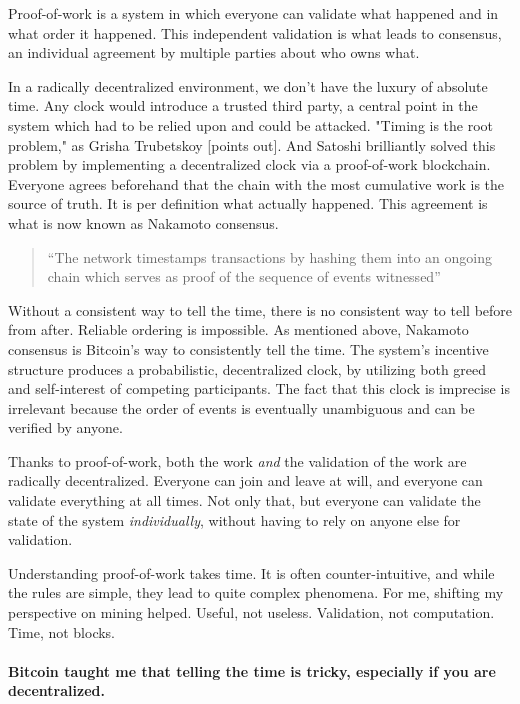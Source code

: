 Proof-of-work is a system in which everyone can validate what happened
and in what order it happened. This independent validation is what leads
to consensus, an individual agreement by multiple parties about who owns
what.

In a radically decentralized environment, we don't have the luxury of
absolute time. Any clock would introduce a trusted third party, a
central point in the system which had to be relied upon and could be
attacked. "Timing is the root problem," as Grisha Trubetskoy [points
out]. And Satoshi brilliantly solved this problem by implementing a
decentralized clock via a proof-of-work blockchain. Everyone agrees
beforehand that the chain with the most cumulative work is the source of
truth. It is per definition what actually happened. This agreement is
what is now known as Nakamoto consensus.

\begin{quotation}
``The network timestamps transactions by hashing them into an ongoing
chain which serves as proof of the sequence of events witnessed''
\end{quotation}

Without a consistent way to tell the time, there is no consistent way to
tell before from after. Reliable ordering is impossible. As mentioned
above, Nakamoto consensus is Bitcoin's way to consistently tell the
time. The system's incentive structure produces a probabilistic,
decentralized clock, by utilizing both greed and self-interest of
competing participants. The fact that this clock is imprecise is
irrelevant because the order of events is eventually unambiguous and can
be verified by anyone.

Thanks to proof-of-work, both the work \textit{and} the validation of the work
are radically decentralized. Everyone can join and leave at will, and
everyone can validate everything at all times. Not only that, but
everyone can validate the state of the system \textit{individually}, without
having to rely on anyone else for validation.

Understanding proof-of-work takes time. It is often counter-intuitive,
and while the rules are simple, they lead to quite complex phenomena.
For me, shifting my perspective on mining helped. Useful, not useless.
Validation, not computation. Time, not blocks.

\paragraph{Bitcoin taught me that telling the time is tricky, especially if you are
decentralized.}

